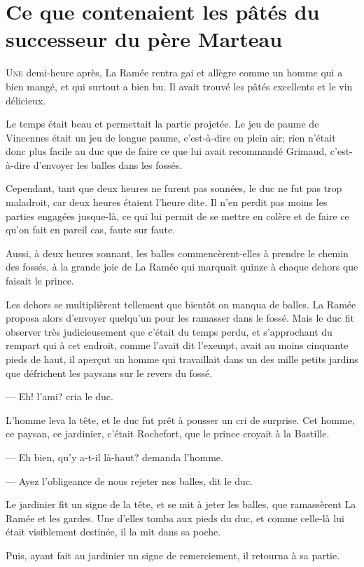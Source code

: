 \chapter{Ce que contenaient les pâtés du successeur du père Marteau}

\lettrine{U}{ne} demi-heure après, La Ramée rentra gai et allègre comme un homme qui a bien mangé, et qui surtout a bien bu. Il avait trouvé les pâtés excellents et le vin délicieux.

\zz
Le temps était beau et permettait la partie projetée. Le jeu de paume de Vincennes était un jeu de longue paume, c'est-à-dire en plein air; rien n'était donc plus facile au duc que de faire ce que lui avait recommandé Grimaud, c'est-à-dire d'envoyer les balles dans les fossés.

Cependant, tant que deux heures ne furent pas sonnées, le duc ne fut pas trop maladroit, car deux heures étaient l'heure dite. Il n'en perdit pas moins les parties engagées jusque-là, ce qui lui permit de se mettre en colère et de faire ce qu'on fait en pareil cas, faute sur faute.

Aussi, à deux heures sonnant, les balles commencèrent-elles à prendre le chemin des fossés, à la grande joie de La Ramée qui marquait quinze à chaque dehors que faisait le prince.

Les dehors se multiplièrent tellement que bientôt on manqua de balles. La Ramée proposa alors d'envoyer quelqu'un pour les ramasser dans le fossé. Mais le duc fit observer très judicieusement que c'était du temps perdu, et s'approchant du rempart qui à cet endroit, comme l'avait dit l'exempt, avait au moins cinquante pieds de haut, il aperçut un homme qui travaillait dans un des mille petits jardins que défrichent les paysans sur le revers du fossé.

— Eh! l'ami? cria le duc.

L'homme leva la tête, et le duc fut prêt à pousser un cri de surprise. Cet homme, ce paysan, ce jardinier, c'était Rochefort, que le prince croyait à la Bastille.

— Eh bien, qu'y a-t-il là-haut? demanda l'homme.

— Ayez l'obligeance de nous rejeter nos balles, dit le duc.

Le jardinier fit un signe de la tête, et se mit à jeter les balles, que ramassèrent La Ramée et les gardes. Une d'elles tomba aux pieds du duc, et comme celle-là lui était visiblement destinée, il la mit dans sa poche.

Puis, ayant fait au jardinier un signe de remerciement, il retourna à sa partie.

